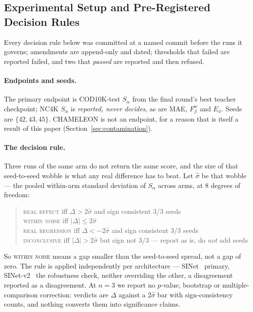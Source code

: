 \documentclass{article} %
\begin{document}
\subsection{Experimental Setup and Pre-Registered Decision Rules}
\label{sec:setup}

Every decision rule below was committed at a named commit before the runs it governs; amendments are
append-only and dated; thresholds that failed are reported failed, and two that \emph{passed} are
reported and then refused.

\paragraph{Endpoints and seeds.} The primary endpoint is COD10K-test $S_\alpha$ from the final
round's best teacher checkpoint; NC4K $S_\alpha$ is \emph{reported, never decides}, as are MAE,
$F_\beta^w$ and $E_\phi$. Seeds are $\{42,43,45\}$. CHAMELEON is not an endpoint, for a reason that is
itself a result of this paper (Section~\ref{sec:contamination}).

\paragraph{The decision rule.} Three runs of the same arm do not return the same score, and the size
of that seed-to-seed wobble is what any real difference has to beat. Let $\hat{\sigma}$ be that
wobble --- the pooled within-arm standard deviation of $S_\alpha$ across arms, at $8$ degrees of
freedom:
\begin{quote}
\begin{tabbing}
\textsc{real effect} \quad\= iff $\Delta > 2\hat{\sigma}$ \; and sign consistent $3/3$ seeds \\
\textsc{within noise} \> iff $|\Delta| \leq 2\hat{\sigma}$ \\
\textsc{real regression} \> iff $\Delta < -2\hat{\sigma}$ \; and sign consistent $3/3$ seeds \\
\textsc{inconclusive} \> iff $|\Delta| > 2\hat{\sigma}$ but sign not $3/3$ --- report as is, do
\emph{not} add seeds
\end{tabbing}
\end{quote}
So \textsc{within noise} means a gap smaller than the seed-to-seed spread, not a gap of zero. The rule is applied independently per architecture --- SINet~\cite{fan2020sinet} primary, SINet-v2~\cite{fan2022concealed} the robustness check,
neither overriding the other, a disagreement reported as a disagreement. At $n = 3$ we report no
$p$-value, bootstrap or multiple-comparison correction: verdicts are $\Delta$ against a
$2\hat{\sigma}$ bar with sign-consistency counts, and nothing converts them into significance
claims.
\end{document}
